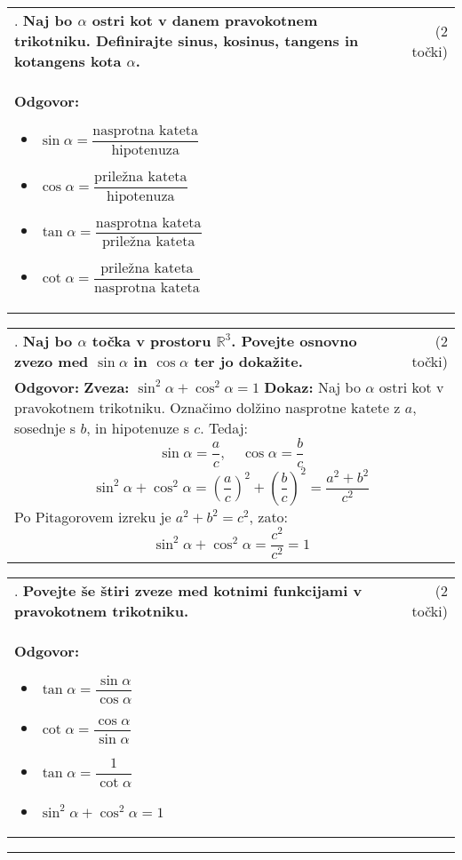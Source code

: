 \documentclass[12pt]{article}
\newcounter{vprasanje}[section]
\renewcommand{\thevprasanje}{\roman{vprasanje}}
\newcommand{\vprasanje}[2]{%
  \stepcounter{vprasanje}%
  \textbf{\thevprasanje}. \textbf{#1} & (#2) \\
}
\newcommand{\odgovor}[1]{%
  \multicolumn{2}{p{\dimexpr\textwidth-2\tabcolsep\relax}}{%
    \small \textbf{Odgovor:} #1%
  } \\[1em]%
}
\newcommand{\crta}{\rule{\textwidth}{0.4pt}}
\newcommand{\razmak}[1]{%
  \vspace{#1}
}
\begin{document}
\begin{tabularx}{\textwidth}{X r}
\vprasanje{Naj bo $\alpha$ ostri kot v danem pravokotnem trikotniku. Definirajte sinus, kosinus, tangens in kotangens kota $\alpha$.}{2 točki}
\odgovor{
\begin{itemize}
  \item $\sin \alpha = \dfrac{\text{nasprotna kateta}}{\text{hipotenuza} }$
  \item $\cos \alpha = \dfrac{\text{priležna kateta}}{\text{hipotenuza} }$
  \item $\tan \alpha = \dfrac{\text{nasprotna kateta}}{\text{priležna kateta}}$
  \item $\cot \alpha = \dfrac{\text{priležna kateta}}{\text{nasprotna kateta}}$
\end{itemize}
}
\end{tabularx}

\begin{tabularx}{\textwidth}{X r}
\vprasanje{Naj bo $\alpha$ točka v prostoru $\mathbb{R}^3$. Povejte osnovno zvezo med $\sin \alpha$ in $\cos \alpha$ ter jo dokažite.}{2 točki}
\odgovor{
\textbf{Zveza:} $\sin^2 \alpha + \cos^2 \alpha = 1$
\textbf{Dokaz:} Naj bo $\alpha$ ostri kot v pravokotnem trikotniku. Označimo dolžino nasprotne katete z $a$, sosednje s $b$, in hipotenuze s $c$. Tedaj:
\[
\sin \alpha = \frac{a}{c}, \quad \cos \alpha = \frac{b}{c}
\]
\[
\sin^2 \alpha + \cos^2 \alpha = \left( \frac{a}{c} \right)^2 + \left( \frac{b}{c} \right)^2 = \frac{a^2 + b^2}{c^2}
\]
Po Pitagorovem izreku je $a^2 + b^2 = c^2$, zato:
\[
\sin^2 \alpha + \cos^2 \alpha = \frac{c^2}{c^2} = 1
\]
}
\end{tabularx}

\begin{tabularx}{\textwidth}{X r}
\vprasanje{Povejte še štiri zveze med kotnimi funkcijami v pravokotnem trikotniku.}{2 točki}
\odgovor{
\begin{itemize}
  \item $\tan \alpha = \dfrac{\sin \alpha}{\cos \alpha}$
  \item $\cot \alpha = \dfrac{\cos \alpha}{\sin \alpha}$
  \item $\tan \alpha = \dfrac{1}{\cot \alpha}$
  \item $\sin^2 \alpha + \cos^2 \alpha = 1$
\end{itemize}
}
\end{tabularx}

\razmak{0.5em}


\crta
\end{document}

